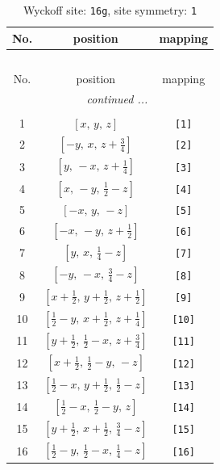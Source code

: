 \documentclass[fleqn,8pt]{jsarticle}
\begin{document}
\begin{longtable}{ccc}
\caption{Wyckoff site: {\tt 16g}, site symmetry: {\tt 1}}
 \\
 \hline \hline
No. & position & mapping \\ \hline \endfirsthead

\multicolumn{2}{l}{\tablename\ \thetable{}} \\
 \hline \hline
No. & position & mapping \\ \hline \endhead

 \hline \hline
\multicolumn{2}{r}{\footnotesize\it continued ...} \\ \endfoot

 \hline \hline
\multicolumn{2}{r}{} \\ \endlastfoot

1 & $\left[ x,\, y,\, z \right]$ & {\tt [1]} \\ \hline
2 & $\left[ - y,\, x,\, z + \frac{3}{4} \right]$ & {\tt [2]} \\ \hline
3 & $\left[ y,\, - x,\, z + \frac{1}{4} \right]$ & {\tt [3]} \\ \hline
4 & $\left[ x,\, - y,\, \frac{1}{2} - z \right]$ & {\tt [4]} \\ \hline
5 & $\left[ - x,\, y,\, - z \right]$ & {\tt [5]} \\ \hline
6 & $\left[ - x,\, - y,\, z + \frac{1}{2} \right]$ & {\tt [6]} \\ \hline
7 & $\left[ y,\, x,\, \frac{1}{4} - z \right]$ & {\tt [7]} \\ \hline
8 & $\left[ - y,\, - x,\, \frac{3}{4} - z \right]$ & {\tt [8]} \\ \hline
9 & $\left[ x + \frac{1}{2},\, y + \frac{1}{2},\, z + \frac{1}{2} \right]$ & {\tt [9]} \\ \hline
10 & $\left[ \frac{1}{2} - y,\, x + \frac{1}{2},\, z + \frac{1}{4} \right]$ & {\tt [10]} \\ \hline
11 & $\left[ y + \frac{1}{2},\, \frac{1}{2} - x,\, z + \frac{3}{4} \right]$ & {\tt [11]} \\ \hline
12 & $\left[ x + \frac{1}{2},\, \frac{1}{2} - y,\, - z \right]$ & {\tt [12]} \\ \hline
13 & $\left[ \frac{1}{2} - x,\, y + \frac{1}{2},\, \frac{1}{2} - z \right]$ & {\tt [13]} \\ \hline
14 & $\left[ \frac{1}{2} - x,\, \frac{1}{2} - y,\, z \right]$ & {\tt [14]} \\ \hline
15 & $\left[ y + \frac{1}{2},\, x + \frac{1}{2},\, \frac{3}{4} - z \right]$ & {\tt [15]} \\ \hline
16 & $\left[ \frac{1}{2} - y,\, \frac{1}{2} - x,\, \frac{1}{4} - z \right]$ & {\tt [16]} \\
\end{longtable}
\end{document}
